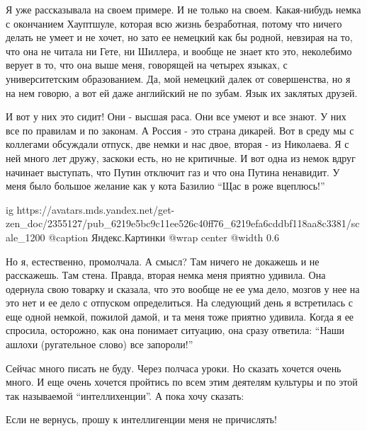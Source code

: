 Я уже рассказывала на своем примере. И не только на своем. Какая-нибудь немка с
окончанием Хауптшуле, которая всю жизнь безработная, потому что ничего делать
не умеет и не хочет, но зато ее немецкий как бы родной, невзирая на то, что она
не читала ни Гете, ни Шиллера, и вообще не знает кто это, неколебимо верует в
то, что она выше меня, говорящей на четырех языках, с университетским
образованием. Да, мой немецкий далек от совершенства, но я на нем говорю, а вот
ей даже английский не по зубам. Язык их заклятых друзей.

И вот у них это сидит! Они - высшая раса. Они все умеют и все знают. У них все
по правилам и по законам. А Россия - это страна дикарей. Вот в среду мы с
коллегами обсуждали отпуск, две немки и нас двое, вторая - из Николаева. Я с
ней много лет дружу, заскоки есть, но не критичные. И вот одна из немок вдруг
начинает выступать, что Путин отключит газ и что она Путина ненавидит. У меня
было большое желание как у кота Базилио \enquote{Щас в роже вцеплюсь!} 

\ifcmt
  ig https://avatars.mds.yandex.net/get-zen_doc/2355127/pub_6219e5bc9c11ee526c40ff76_6219efa6cddbf118aa8c3381/scale_1200
	@caption Яндекс.Картинки
	@wrap center
	@width 0.6
\fi

Но я, естественно, промолчала. А смысл? Там ничего не докажешь и не расскажешь.
Там стена. Правда, вторая немка меня приятно удивила. Она одернула свою товарку
и сказала, что это вообще не ее ума дело, мозгов у нее на это нет и ее дело с
отпуском определиться. На следующий день я встретилась с еще одной немкой,
пожилой дамой, и та меня тоже приятно удивила. Когда я ее спросила, осторожно,
как она понимает ситуацию, она сразу ответила: \enquote{Наши ашлохи
(ругательное слово) все запороли!}

Сейчас много писать не буду. Через полчаса уроки. Но сказать хочется очень
много. И еще очень хочется пройтись по всем этим деятелям культуры и по этой
так называемой \enquote{интеллихенции}. А пока хочу сказать:

Если не вернусь, прошу к интеллигенции меня не причислять!
